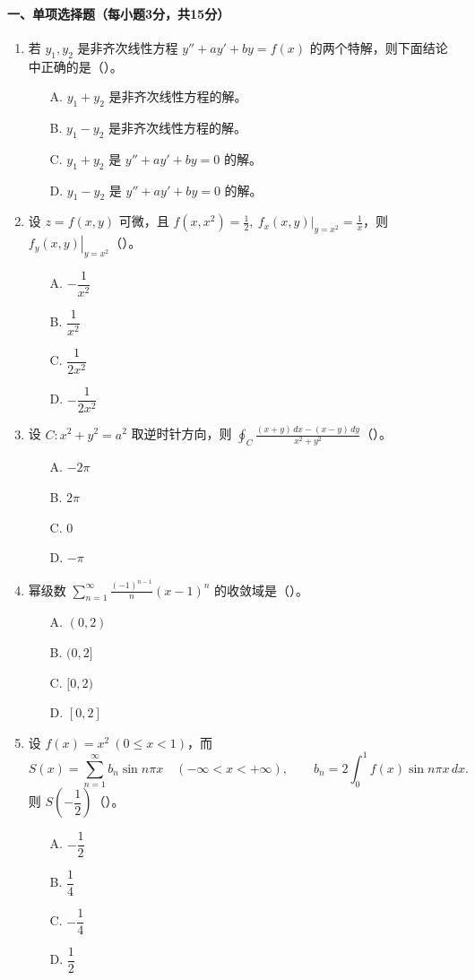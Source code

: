 \paragraph*{一、单项选择题（每小题3分，共15分）}
\begin{enumerate}
  \item 若 $y_1,y_2$ 是非齐次线性方程 $y''+ay'+by=f(x)$ 的两个特解，则下面结论中正确的是（\quad）。
  \begin{enumerate}
    \item[A.] $y_1+y_2$ 是非齐次线性方程的解。
    \item[B.] $y_1-y_2$ 是非齐次线性方程的解。
    \item[C.] $y_1+y_2$ 是 $y''+ay'+by=0$ 的解。
    \item[D.] $y_1-y_2$ 是 $y''+ay'+by=0$ 的解。
  \end{enumerate}

  \item 设 $z=f(x,y)$ 可微，且 $f(x,x^2)=\frac12,\ \left.f_x(x,y)\right|_{y=x^2}=\frac1x$，则 $\left.f_y(x,y)\right|_{y=x^2}$（\quad）。
  \begin{enumerate}
    \item[A.] $-\dfrac{1}{x^2}$
    \item[B.] $\dfrac{1}{x^2}$
    \item[C.] $\dfrac{1}{2x^2}$
    \item[D.] $-\dfrac{1}{2x^2}$
  \end{enumerate}

  \item 设 $C:x^2+y^2=a^2$ 取逆时针方向，则 $\displaystyle\oint_C \frac{(x+y)\,dx-(x-y)\,dy}{x^2+y^2}$（\quad）。
  \begin{enumerate}
    \item[A.] $-2\pi$
    \item[B.] $2\pi$
    \item[C.] $0$
    \item[D.] $-\pi$
  \end{enumerate}

  \item 幂级数 $\displaystyle\sum_{n=1}^{\infty}\frac{(-1)^{n-1}}{n}(x-1)^n$ 的收敛域是（\quad）。
  \begin{enumerate}
    \item[A.] $(0,2)$
    \item[B.] $(0,2]$
    \item[C.] $[0,2)$
    \item[D.] $[0,2]$
  \end{enumerate}

  \item 设 $f(x)=x^2\ (0\le x<1)$，而
  \[
    S(x)=\sum_{n=1}^{\infty}b_n\sin n\pi x\quad(-\infty<x<+\infty),
    \qquad
    b_n=2\int_0^1 f(x)\sin n\pi x\,dx.
  \]
  则 $S\!\left(-\dfrac12\right)$（\quad）。
  \begin{enumerate}
    \item[A.] $-\dfrac12$
    \item[B.] $\dfrac14$
    \item[C.] $-\dfrac14$
    \item[D.] $\dfrac12$
  \end{enumerate}
\end{enumerate}

